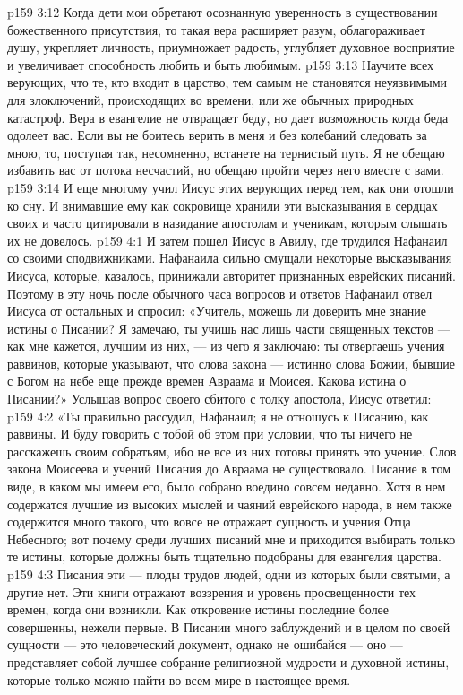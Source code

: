 \vs p159 3:12 \pc Когда дети мои обретают осознанную уверенность в существовании божественного присутствия, то такая вера расширяет разум, облагораживает душу, укрепляет личность, приумножает радость, углубляет духовное восприятие и увеличивает способность любить и быть любимым.
\vs p159 3:13 Научите всех верующих, что те, кто входит в царство, тем самым не становятся неуязвимыми для злоключений, происходящих во времени, или же обычных природных катастроф. Вера в евангелие не отвращает беду, но дает возможность  когда беда одолеет вас. Если вы не боитесь верить в меня и без колебаний следовать за мною, то, поступая так, несомненно, встанете на тернистый путь. Я не обещаю избавить вас от потока несчастий, но обещаю пройти через него вместе с вами.
\vs p159 3:14 \pc И еще многому учил Иисус этих верующих перед тем, как они отошли ко сну. И внимавшие ему как сокровище хранили эти высказывания в сердцах своих и часто цитировали в назидание апостолам и ученикам, которым слышать их не довелось.
\vs p159 4:1 И затем пошел Иисус в Авилу, где трудился Нафанаил со своими сподвижниками. Нафанаила сильно смущали некоторые высказывания Иисуса, которые, казалось, принижали авторитет признанных еврейских писаний. Поэтому в эту ночь после обычного часа вопросов и ответов Нафанаил отвел Иисуса от остальных и спросил: «Учитель, можешь ли доверить мне знание истины о Писании? Я замечаю, ты учишь нас лишь части священных текстов --- как мне кажется, лучшим из них, --- из чего я заключаю: ты отвергаешь учения раввинов, которые указывают, что слова закона --- истинно слова Божии, бывшие с Богом на небе еще прежде времен Авраама и Моисея. Какова истина о Писании?» Услышав вопрос своего сбитого с толку апостола, Иисус ответил:
\vs p159 4:2 \pc «Ты правильно рассудил, Нафанаил; я не отношусь к Писанию, как раввины. И буду говорить с тобой об этом при условии, что ты ничего не расскажешь своим собратьям, ибо не все из них готовы принять это учение. Слов закона Моисеева и учений Писания до Авраама не существовало. Писание в том виде, в каком мы имеем его, было собрано воедино совсем недавно. Хотя в нем содержатся лучшие из высоких мыслей и чаяний еврейского народа, в нем также содержится много такого, что вовсе не отражает сущность и учения Отца Небесного; вот почему среди лучших писаний мне и приходится выбирать только те истины, которые должны быть тщательно подобраны для евангелия царства.
\vs p159 4:3 Писания эти --- плоды трудов людей, одни из которых были святыми, а другие нет. Эти книги отражают воззрения и уровень просвещенности тех времен, когда они возникли. Как откровение истины последние более совершенны, нежели первые. В Писании много заблуждений и в целом по своей сущности --- это человеческий документ, однако не ошибайся --- оно --- представляет собой лучшее собрание религиозной мудрости и духовной истины, которые только можно найти во всем мире в настоящее время.
